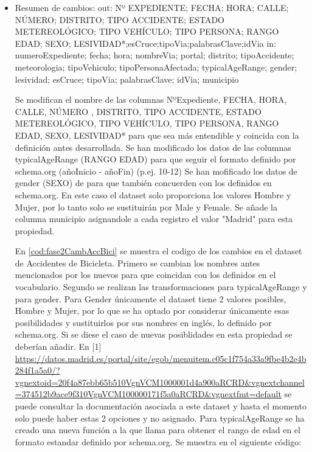 \begin{itemize}
	\item Resumen de cambios:
	\newline out: Nº  EXPEDIENTE; FECHA; HORA; CALLE; NÚMERO; DISTRITO; TIPO ACCIDENTE; ESTADO METEREOLÓGICO; TIPO VEHÍCULO; TIPO PERSONA; RANGO EDAD; SEXO; LESIVIDAD*;esCruce;tipoVia;palabrasClave;idVia
	\newline in: numeroExpediente; fecha; hora; nombreVia; portal; distrito; tipoAccidente; meteorologia; tipoVehiculo; tipoPersonaAfectada; typicalAgeRange; gender; lesividad; esCruce; tipoVia; palabrasClave; idVia; municipio
	\newline


Se modifican el nombre de las columnas  NºExpediente, FECHA, HORA, CALLE, NÚMERO , DISTRITO, TIPO ACCIDENTE, ESTADO METEREOLÓGICO, TIPO VEHÍCULO, TIPO PERSONA, RANGO EDAD, SEXO, LESIVIDAD* para que sea más entendible y coincida con la definición antes desarrollada.
	\newline
Se han modificado los datos de las columnas typicalAgeRange (RANGO EDAD) para que seguir el formato definido por schema.org (añoInicio - añoFin) (p.ej. 10-12)
	\newline
Se han mofificado los datos de gender (SEXO) de para que también concuerden con los definidos en schema.org. En este caso el dataset solo proporciona los valores Hombre y Mujer, por lo tanto solo se sustituirán por Male y Female.
	\newline
Se añade la columna municipio asignandole a cada registro el valor "Madrid" para esta propiedad.
	\newline
	
	    

	    
En \ref{cod:fase2CambAccBici} se muestra el codigo de los cambios en el dataset de Accidentes de Bicicleta.
\newline
Primero se cambian los nombres antes mencionados por los nuevos para que coincidan con los definidos en el vocabulario.
\newline
Segundo se realizan las transformaciones para typicalAgeRange y para gender. Para Gender únicamente el dataset tiene 2 valores posibles, Hombre y Mujer, por lo que se ha optado por considerar únicamente esas posibilidades y sustituirlos por sus nombres en inglés, lo definido por schema.org. Si se diese el caso de nuevas posiblidades en esta propiedad se deberían añadir. En [1] \url{https://datos.madrid.es/portal/site/egob/menuitem.c05c1f754a33a9fbe4b2e4b284f1a5a0/?vgnextoid=20f4a87ebb65b510VgnVCM1000001d4a900aRCRD&vgnextchannel=374512b9ace9f310VgnVCM100000171f5a0aRCRD&vgnextfmt=default} se puede consultar la documentación asociada a este dataset y hasta el momento solo puede haber estas 2 opciones y no asignado.
\newline
Para typicalAgeRange se ha creado una nueva función a la que llama para obtener el rango de edad en el formato estandar definido por schema.org. Se muestra en el siguiente código:


\end{itemize}
